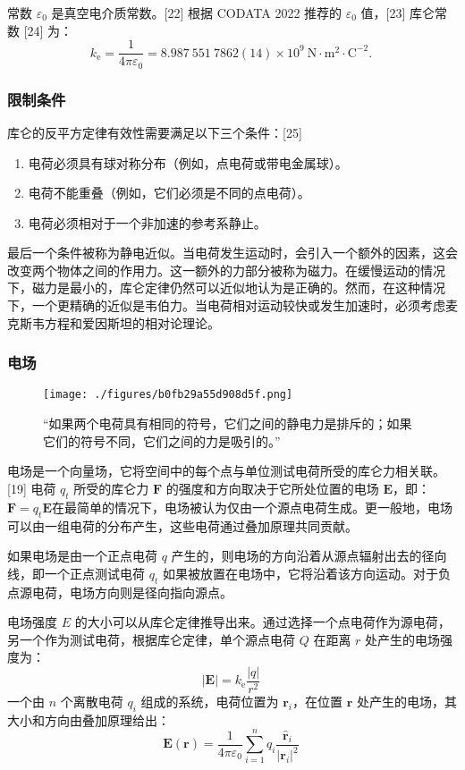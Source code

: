 常数 \(\varepsilon_0\) 是真空电介质常数。[22] 根据 CODATA 2022 推荐的 \(\varepsilon_0\) 值，[23] 库仑常数 [24] 为：
\[
k_{\text{e}} = \frac{1}{4 \pi \varepsilon_0} = 8.987\ 551\ 7862(14) \times 10^9 \ \mathrm{N \cdot m^2 \cdot C^{-2}}.~
\]
\subsubsection{限制条件}
库仑的反平方定律有效性需要满足以下三个条件：[25]
\begin{enumerate}
\item 电荷必须具有球对称分布（例如，点电荷或带电金属球）。
\item 电荷不能重叠（例如，它们必须是不同的点电荷）。
\item 电荷必须相对于一个非加速的参考系静止。
\end{enumerate}
最后一个条件被称为静电近似。当电荷发生运动时，会引入一个额外的因素，这会改变两个物体之间的作用力。这一额外的力部分被称为磁力。在缓慢运动的情况下，磁力是最小的，库仑定律仍然可以近似地认为是正确的。然而，在这种情况下，一个更精确的近似是韦伯力。当电荷相对运动较快或发生加速时，必须考虑麦克斯韦方程和爱因斯坦的相对论理论。
\subsubsection{电场}  
\begin{figure}[ht]
\centering
\texttt{[image: ./figures/b0fb29a55d908d5f.png]}
\caption{“如果两个电荷具有相同的符号，它们之间的静电力是排斥的；如果它们的符号不同，它们之间的力是吸引的。”} \label{fig_KL_5}
\end{figure}
电场是一个向量场，它将空间中的每个点与单位测试电荷所受的库仑力相关联。[19] 电荷 \(q_t\) 所受的库仑力 \(\mathbf{F}\) 的强度和方向取决于它所处位置的电场 \(\mathbf{E}\)，即：\(\mathbf{F} = q_t \mathbf{E}\)在最简单的情况下，电场被认为仅由一个源点电荷生成。更一般地，电场可以由一组电荷的分布产生，这些电荷通过叠加原理共同贡献。

如果电场是由一个正点电荷 \(q\) 产生的，则电场的方向沿着从源点辐射出去的径向线，即一个正点测试电荷 \(q_t\) 如果被放置在电场中，它将沿着该方向运动。对于负点源电荷，电场方向则是径向指向源点。

电场强度 \(E\) 的大小可以从库仑定律推导出来。通过选择一个点电荷作为源电荷，另一个作为测试电荷，根据库仑定律，单个源点电荷 \(Q\) 在距离 \(r\) 处产生的电场强度为：
\[
|\mathbf{E}| = k_{\text{e}} \frac{|q|}{r^2}~
\]
一个由 \(n\) 个离散电荷 \(q_i\) 组成的系统，电荷位置为 \(\mathbf{r}_i\)，在位置 \(\mathbf{r}\) 处产生的电场，其大小和方向由叠加原理给出：
\[
\mathbf{E}(\mathbf{r}) = \frac{1}{4 \pi \varepsilon_0} \sum_{i=1}^{n} q_i \frac{\hat{\mathbf{r}}_i}{|\mathbf{r}_i|^2}~
\]
